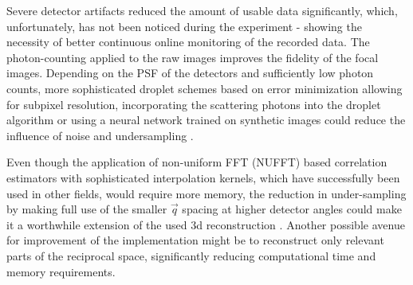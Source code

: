 Severe detector artifacts reduced the amount of usable data significantly, which, unfortunately, has not been noticed during the experiment - showing the necessity of better continuous online monitoring of the recorded data. The photon-counting applied to the raw images improves the fidelity of the focal images. Depending on the PSF of the detectors and sufficiently low photon counts, more sophisticated droplet schemes based on error minimization allowing for subpixel resolution, incorporating the scattering photons into the droplet algorithm or using a neural network trained on synthetic images could reduce the influence of noise and undersampling \cite{baumann2018,collaboration2014,schayck2020,sun2020}.

Even though the application of non-uniform FFT (NUFFT) based correlation estimators with sophisticated interpolation kernels, which have successfully been used in other fields, would require more memory, the reduction in under-sampling by making full use of the smaller $\vec{q}$ spacing at higher detector angles could make it a worthwhile extension of the used 3d reconstruction \cite{laguna1998,yang2008,chang2020}. Another possible avenue for improvement of the implementation might be to reconstruct only relevant parts of the reciprocal space, significantly reducing computational time and memory requirements. 

